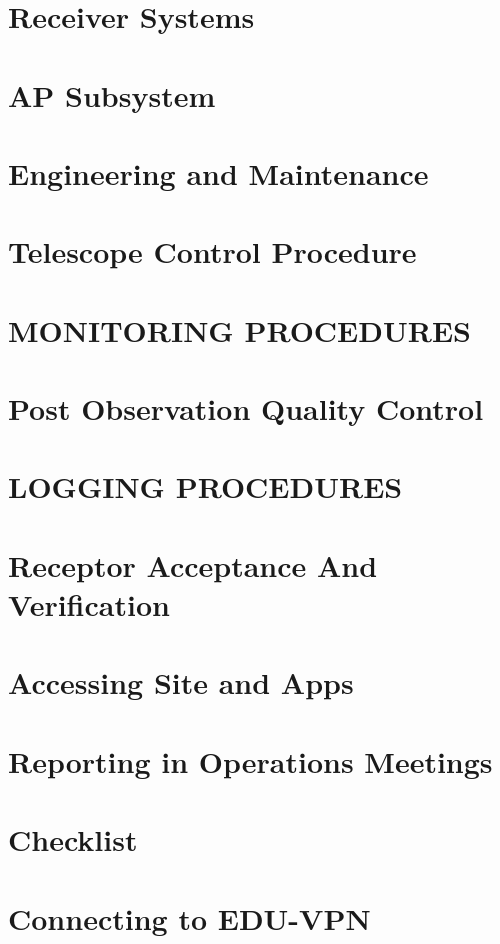 \documentclass[12pt]{report}
\begin{document}
 
 \chapter{Receiver Systems}
 
 
 \chapter{ AP Subsystem}
 
 
 \chapter{Engineering and Maintenance}
 
\chapter{Telescope Control Procedure}
 
 \chapter{ MONITORING PROCEDURES}
 
 \chapter{Post Observation Quality Control}
 

\chapter{LOGGING PROCEDURES}


\chapter{ Receptor Acceptance And Verification}
 
 
 \chapter{Accessing Site and Apps }
 
 
\chapter{Reporting in Operations Meetings
	 }
	 
% 
 \appendix
 \chapter{Checklist}
 
 
 \chapter{Connecting to EDU-VPN}
  
 

 
\end{document}
